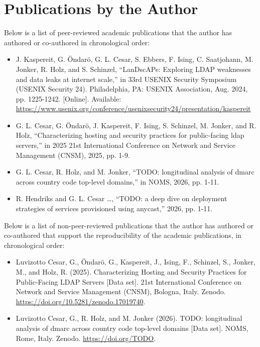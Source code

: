 \chapter*{Publications by the Author}
\label{sec:publications}

Below is a list of peer-reviewed academic publications that the author has authored or co-authored in chronological order:

\begin{itemize}
    \item J. Kaspereit, G. Öndarö, G. L. Cesar, S. Ebbers, F. Ising, C. Saatjohann, M. Jonker, R. Holz, and S. Schinzel, ``LanDscAPe: Exploring LDAP weaknesses and data leaks at internet scale,'' in 33rd USENIX Security Symposium (USENIX Security 24). Philadelphia, PA: USENIX Association, Aug. 2024, pp. 1225-1242. [Online]. Available: \url{https://www.usenix.org/conference/usenixsecurity24/presentation/kaspereit}

    \item G. L. Cesar, G. Öndarö, J. Kaspereit, F. Ising, S. Schinzel, M. Jonker, and R. Holz, ``Characterizing hosting and security practices for public-facing ldap servers,'' in 2025 21st International Conference on Network and Service Management (CNSM), 2025, pp. 1-9.

    \item G. L. Cesar, R. Holz, and M. Jonker, ``TODO: longitudinal analysis of dmarc across country code top-level domains,'' in NOMS, 2026, pp. 1-11.

    \item R. Hendriks and G. L. Cesar \ldots , ``TODO: a deep dive on deployment strategies of services provisioned using anycast,'' 2026, pp. 1-11.

\end{itemize}

Below is a list of non-peer-reviewed \dataset publications that the author has authored or co-authored that support the reproducibility of the academic publications, in chronological order:

\begin{itemize}
    \item Luvizotto Cesar, G., Öndarö, G., Kaspereit, J., Ising, F., Schinzel, S., Jonker, M., and Holz, R. (2025). Characterizing Hosting and Security Practices for Public-Facing LDAP Servers [Data set]. 21st International Conference on Network and Service Management (CNSM), Bologna, Italy. Zenodo. \url{https://doi.org/10.5281/zenodo.17019740}.

    \item Luvizotto Cesar, G., R. Holz, and M. Jonker (2026). TODO: longitudinal analysis of dmarc across country code top-level domains [Data set]. NOMS, Rome, Italy. Zenodo. \url{https://doi.org/TODO}.

\end{itemize}
